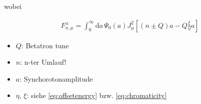 \documentclass[12pt]{article}%
\begin{document}
\begin{itemize}
		wobei 
		
		\begin{align*}
			F_{n,\mu}^\pm = \int_{0}^{\infty} \mathrm{d}a \, \Psi_0(a)J^2_\mu[(n\pm Q)a-Q\frac{\xi}{\eta}a]
		\end{align*}
	
		\begin{itemize}
			\item $Q$: Betatron tune
			\item $n$: n-ter Umlauf! 
			\item $a$: Synchorotonamplitude
			\item $\eta$, $\xi$: siehe \eqref{eq:offsetenergy} bzw. \eqref{eq:chromaticity}
			
		\end{itemize}
	
\end{itemize}
\end{document}
